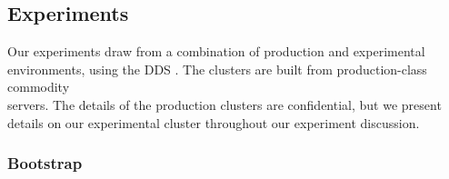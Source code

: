\subsection{Experiments}
\label{sec:experiments}
%
Our experiments draw from a combination of production and experimental
environments, using the DDS \ES.  The clusters are built from
production-class commodity \\ servers.  The details of the production
clusters are confidential, but we present details on our experimental cluster 
throughout our experiment discussion. 


\subsubsection{Bootstrap}
\label{sec:bootstrap}
%


